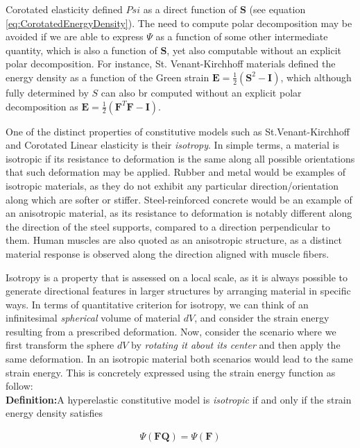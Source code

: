 Corotated elasticity defined $Psi$ as a direct function of $\boldsymbol{S}$ (see equation \ref{eq:CorotatedEnergyDensity}). 
The need to compute polar decomposition may be avoided if we are able to express $\Psi$ as a function of some other intermediate
quantity, which is also a function of $\boldsymbol{S}$, yet also computable without an explicit polar decomposition. For instance, 
St. Venant-Kirchhoff materials defined the energy density as a function of the Green strain 
$\boldsymbol{E} = \frac{1}{2}(\boldsymbol{S}^2 - \boldsymbol{I})$, which although fully determined by $S$ can also br computed without 
an explicit polar decomposition as $\boldsymbol{E} = \frac{1}{2}(\boldsymbol{F}^T\boldsymbol{F} - \boldsymbol{I})$.

One of the distinct properties of constitutive models such as St.Venant-Kirchhoff and Corotated Linear elasticity is their \textit{isotropy}.
In simple terms, a material is isotropic if its resistance to deformation is the same along all possible orientations that such deformation 
may be applied. Rubber and metal would be examples of isotropic materials, as they do not exhibit any particular direction/orientation along
which are softer or stiffer. Steel-reinforced concrete would be an example of an anisotropic material, as its resistance to deformation is 
notably different along the direction of the steel supports, compared to a direction perpendicular to them. Human muscles are also quoted 
as an anisotropic structure, as a distinct material response is observed along the direction aligned with muscle fibers.

Isotropy is a property that is assessed on a local scale, as it is always possible to generate directional features in larger structures by 
arranging material in specific ways. In terms of quantitative criterion for isotropy, we can think of an infinitesimal \textit{spherical} 
volume of material $dV$, and consider the strain energy resulting from a prescribed deformation. Now, consider the scenario where we first 
transform the sphere $dV$ by \textit{rotating it about its center} and then apply the same deformation. In an isotropic material both
scenarios would lead to the same strain energy. This is concretely expressed using the strain energy function as follow:\\

\textbf{Definition:}A hyperelastic constitutive model is \textit{isotropic} if and only if the strain energy density satisfies

\begin{gather*}
 \Psi(\boldsymbol{FQ}) = \Psi(\boldsymbol{F})
\end{gather*}

